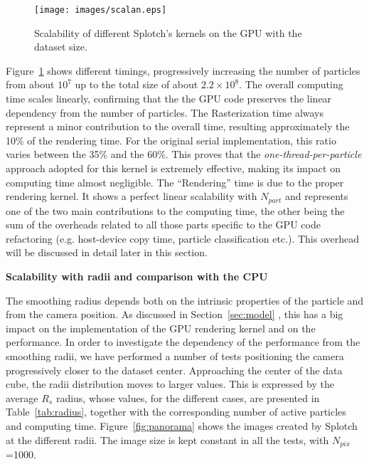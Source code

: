 \documentclass[11pt]{article}
\begin{document}
\begin{figure}
\centering
\texttt{[image: images/scalan.eps]}
\caption{Scalability of different Splotch's kernels on the GPU with the dataset size.}
\label{fig:scalability}
\end{figure}

Figure~\ref{fig:scalability} shows different timings, progressively increasing the number of particles
from about $10^7$ up to the total size of about $2.2\times 10^8$. 
The overall computing time scales linearly, 
confirming that the the GPU code preserves the linear dependency from the 
number of particles. 
The Rasterization time always represent 
a minor contribution to the overall time, resulting approximately the 10\% of the rendering 
time. For the original serial implementation, this ratio varies between the 35\% and the 60\%.
This proves that the {\it one-thread-per-particle} approach adopted for this kernel
is extremely effective, making its impact on computing time almost negligible.
The ``Rendering'' time 
is due to the proper rendering kernel. It shows a perfect linear scalability
with $N_{part}$ and represents one of the two main contributions
to the computing time, the other being the sum of the overheads related to all those 
parts specific to the GPU code refactoring 
(e.g. host-device copy time, particle classification etc.). 
This overhead  will be discussed in detail later in this section.

\medskip
\noindent
{\bf Scalability with radii and comparison with the CPU}

\noindent
The smoothing radius depends both on the intrinsic properties of the particle
and from the camera position. 
As discussed in Section~\ref{sec:model} , this has a big impact 
on the implementation of the GPU rendering kernel and
on the performance. In order to investigate the dependency of the performance from
the smoothing radii, we have performed a number of tests 
positioning the camera progressively closer to the dataset center. 
Approaching the center of the 
data cube, the radii distribution moves to larger values. This is expressed 
by the average $R_s$ radius, whose values, for the different cases, are presented in 
Table~\ref{tab:radius}, together with the corresponding number of active particles and computing time. 
Figure~\ref{fig:panorama} shows the images created by Splotch at the different radii.
The image size is kept constant in all the tests, with $N_{pix}$=1000.
\end{document}
